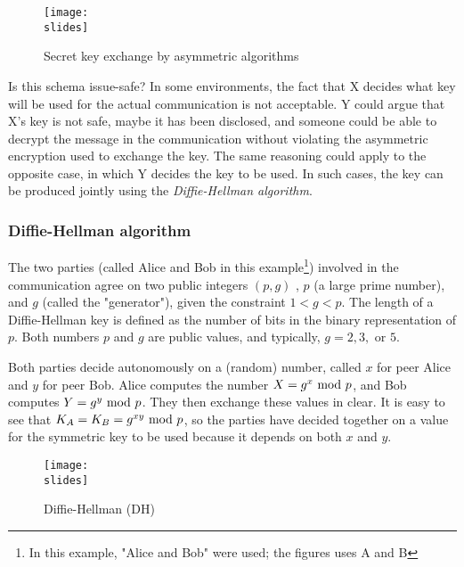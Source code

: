 \begin{figure}[h]
    \centering
    \texttt{[image: \\slides]}
    \caption{Secret key exchange
        by asymmetric algorithms}
    \label{fig:keyexchangeasymmetric}
\end{figure}

Is this schema issue-safe? In some environments, the fact that X decides what key will be used for the actual communication is not acceptable. Y could argue that X's key is not safe, maybe it has been disclosed, and someone could be able to decrypt the message in the communication without violating the asymmetric encryption used to exchange the key. The same reasoning could apply to the opposite case, in which Y decides the key to be used. In such cases, the key can be produced jointly using the \textit{Diffie-Hellman algorithm}.

\subsubsection*{Diffie-Hellman algorithm}
The two parties (called Alice and Bob in this example\footnote{In this example, "Alice and Bob" were used; the figures uses A and B}) involved in the communication agree on two public integers $(p,g)$ , $p$ (a large prime number), and $g$ (called the "generator"), given the constraint $1 < g < p$.
The length of a Diffie-Hellman key is defined as the number of bits in the binary representation of \(p\). Both numbers $p$ and $g$ are public values, and typically, $g = 2, 3, \text{ or } 5$.

Both parties decide autonomously on a (random) number, called $x$ for peer Alice and $y$ for peer Bob. Alice computes the number $ X = g^x \text{ mod } p $, and Bob computes $Y = g^y \text{ mod } p$. They then exchange these values in clear.
It is easy to see that $K_A = K_B = g^{xy}\text{ mod } p$, so the parties have decided together on a value for the symmetric key to be used because it depends on both $x$ and $y$.


\begin{figure}[h]
    \centering
    \texttt{[image: \\slides]}
    \caption{Diffie-Hellman (DH)}
    \label{fig:diffie-hellman}
\end{figure}

